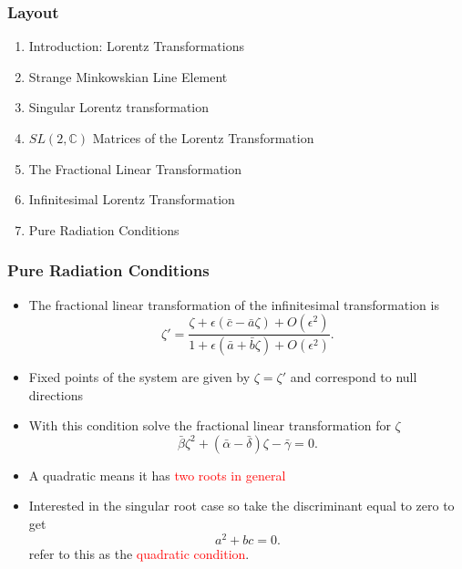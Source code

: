 \documentclass[10pt,a4paper]{beamer}
\begin{document}
\begin{frame}
\frametitle{Layout}
\begin{enumerate}
\item<1>{Introduction: Lorentz Transformations}
\item<1>{Strange Minkowskian Line Element}
\item<1>{Singular Lorentz transformation}
\item<1>{$SL(2,\mathbb{C})$ Matrices of the Lorentz Transformation}
\item<1>{The Fractional Linear Transformation}
\item<1>{Infinitesimal Lorentz Transformation}
\item<1>{Pure Radiation Conditions}
\end{enumerate}
\end{frame}


\begin{frame}
\frametitle{Pure Radiation Conditions}
\begin{itemize}
\item<1->{The fractional linear transformation of the infinitesimal transformation is
\begin{equation*}
\zeta' = \frac{\zeta + \epsilon(\bar{c} - \bar{a}\zeta) + O(\epsilon^2)}{1 + \epsilon(\bar{a} + \bar{b} \zeta) + O(\epsilon^2)}.
\end{equation*}}
\item<2->{Fixed points of the system are given by $\zeta = \zeta'$ and correspond to null directions}
\item<3->{With this condition solve the fractional linear transformation for $\zeta$ $$\bar{\beta}\zeta^2 + (\bar{\alpha}- \bar{\delta})\zeta - \bar{\gamma} = 0.$$}
\item<4->{A quadratic means it has \textcolor{red}{two roots in general}}
\item<5->{Interested in the singular root case so take the discriminant equal to zero to get
\begin{equation*}
a^2 +bc = 0.
\end{equation*}
\noindent refer to this as the \textcolor{red}{quadratic condition}.}
\end{itemize}

\end{frame}
\end{document}
